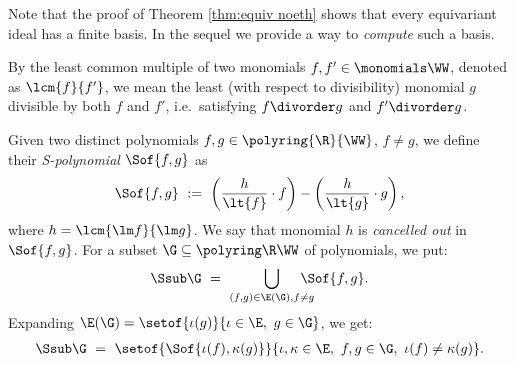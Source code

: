 \begin{remark} \label{rem:Grob}
\rm
Note that the proof of Theorem \ref{thm:equiv noeth} shows that every equivariant ideal has a finite \Gr basis.
In the sequel we provide a way to \emph{compute} such a basis.
\end{remark}

%

% 

By the least common multiple of two monomials $f,f'\in\monomials \WW$,
denoted as $\lcm {f}{f'}$, we mean
the least  (with respect to divisibility) monomial $g$ divisible by both $f$ and $f'$, i.e.~satisfying 
$f \divorder g$ and $f' \divorder g$.

\begin{definition}[$S$-polynomials]\label{def:S-poly}\rm
Given two distinct polynomials $f,g \in \polyring{\R}{\WW}$, $f\neq g$,
we define their \emph{S-polynomial} $\Sof {f,g}$ as
\[
\Sof{f,g} \ := \ \left(\frac{h}{\lt{f}}\cdot f\right) -
\left(\frac{h}{\lt{g}}\cdot g\right),
\]
where $h = \lcm {\lm f} {\lm g}$.
We say that monomial $h$ is \emph{cancelled out} in $\Sof{f,g}$.
For a subset $\G\subseteq{\polyring \R \WW}$ of polynomials, we put:
\begin{align*}
\Ssub \G \ = \ 
\bigcup_{(f,g)\in\E(\G),f \neq g} \! \! \! \! \!\!\! \Sof{f,g}.
\end{align*}
%
Expanding $\E(\G) = \setof{\iota(g)}{\iota\in\E,\ g\in\G}$, we get:
\begin{align*}
\Ssub \G \ = \ 
\setof{\Sof{\iota(f), \kappa(g)}}{\iota,\kappa\in\E, \ f,g\in\G, \ \iota(f)\neq\kappa(g)}.
\end{align*}
\end{definition}
%

